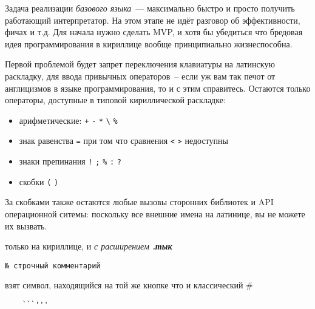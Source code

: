 \clearpage{}\label{core}\secdown

Задача реализации \emph{базового языка}\ --- максимально быстро и просто
получить работающий интерпретатор. На этом этапе не идёт разговор об
эффективности, фичах и т.д. Для начала нужно сделать MVP, и хотя бы убедиться
что бредовая идея программирования в кириллице вообще принципиально
жизнеспособна.

Первой проблемой будет запрет переключения клавиатуры на латинскую
раскладку, для ввода привычных операторов\ -- если уж вам так печот от
англицизмов в языке программирования, то и с этим справитесь. Остаются только
операторы, доступные в типовой кириллической раскладке:
\begin{itemize}[nosep]
    \item арифметические: \verb$+$ \verb$-$ \verb$*$ \verb$\$ \verb$%$
    \item знак равенства \verb$=$ при том что сравнения \verb$<$ \verb$>$ недоступны
    \item знаки препинания \verb$!$ \verb$;$ \verb$%$ \verb$:$ \verb$?$
    \item скобки \verb$($ \verb$)$
\end{itemize}

\clearpage
За скобками также остаются любые вызовы сторонних библиотек и API операционной
ситемы: поскольку все внешние имена на латинице, вы не можете их вызвать.


только на кириллице, и \emph{с расширением \textbf{.тык}}


\begin{verbatim}
№ строчный комментарий
\end{verbatim}

взят символ, находящийся на той же кнопке что и классический \#


\begin{verbatim}
    ```'''
\end{verbatim}

\secup
